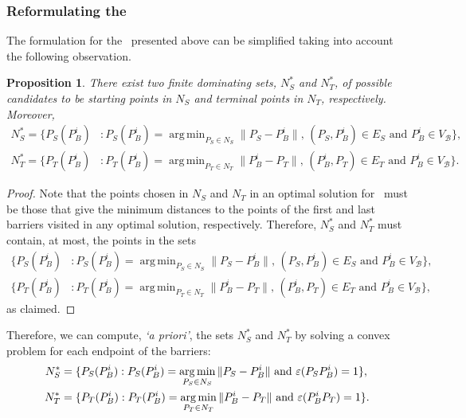 \documentclass[a4paper,  review, authoryear, 1p.]{elsarticle}
\DeclareMathOperator*{\argmin}{arg\,min}
\newcommand{\SPPN}{{\sf{H-SPPN}\xspace }}
\newcommand{\VB}{{V^{}_{\mathcal B}}}
\newtheorem{prop}{Proposition}
\newcommand{\CV}[1]{{\color{red}#1}}
\begin{document}
	\subsubsection{Reformulating the \SPPN}\label{section:reformulation}
	The formulation for the \SPPN \ presented above can be simplified taking into account the following observation.
	\begin{prop}
		There exist two finite dominating sets, $N_S^*$ and $N_T^*$, of possible candidates to be starting points in $N_S$ and terminal points in $N_T$, respectively. Moreover,
		\begin{align*}
			N^*_S=\{P_S(P_B^i)&:P_S(P_B^i)=\argmin_{P_S\in N_S} \|P_S - P_B^i\|,\,(P_S, P_B^i)\in E_S\text{ and }P_B^i\in\VB\},\\
			N^*_T=\{P_T(P_B^i)&:P_T(P_B^i)=\argmin_{P_T\in N_T} \|P_B^i - P_T\|,\,(P_B^i, P_T)\in E_T\text{ and }P_B^i\in\VB\}.
		\end{align*} 
	\end{prop}
	\begin{proof}
		Note that the points chosen in $N_S$ and $N_T$ in an optimal solution for \SPPN \ must be those that give the minimum distances to the points of the first and last barriers visited in any optimal solution, respectively. Therefore, $N_S^*$ and $N_T^*$ must contain, at most, the points in the sets
		\begin{align*}
			\{P_S(P_B^i)&:P_S(P_B^i)=\argmin_{P_S\in N_S} \|P_S - P_B^i\|,\,(P_S, P_B^i)\in E_S\text{ and }P_B^i\in\VB\},\\
			\{P_T(P_B^i)&:P_T(P_B^i)=\argmin_{P_T\in N_T} \|P_B^i - P_T\|,\,(P_B^i, P_T)\in E_T\text{ and }P_B^i\in\VB\},
		\end{align*} 
		as claimed.
	\end{proof}
	\noindent
	Therefore, we can compute, \textit{`a priori'},  the sets $N_S^*$ and $N_T^*$ by solving a convex problem for each endpoint of the barriers:
	\begin{align*}
		N_S^*&=\{P_S(P_B^i):P_S(P_B^i)=\argmin_{P_S\in N_S} \|P_S - P_B^i\|\text{ and }\varepsilonvar{P_S}{P_B^i}=1\},\\
		N_T^*&=\{P_T(P_B^i):P_T(P_B^i)=\argmin_{P_T\in N_T} \|P_B^i - P_T\|\text{ and }\varepsilonvar{P_B^i}{P_T}=1\}.
	\end{align*}
	
	
\end{document}
